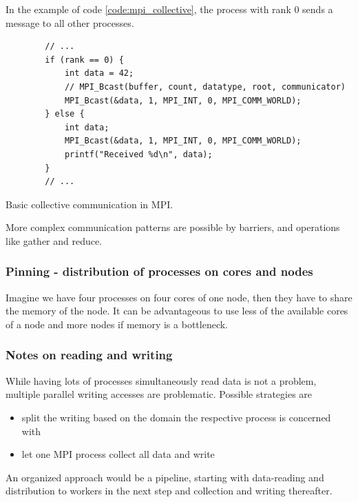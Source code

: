 In the example of code \ref{code:mpi_collective}, the process with rank $0$ sends
a message to all other processes.

\begin{codebox}[!htb]
    \begin{verbatim}
        // ...
        if (rank == 0) {
            int data = 42;
            // MPI_Bcast(buffer, count, datatype, root, communicator)
            MPI_Bcast(&data, 1, MPI_INT, 0, MPI_COMM_WORLD);
        } else {
            int data;
            MPI_Bcast(&data, 1, MPI_INT, 0, MPI_COMM_WORLD);
            printf("Received %d\n", data);
        }
        // ...
    \end{verbatim}
    \caption{Basic collective communication in MPI.}
    \label{code:mpi_collective}
\end{codebox}

More complex communication patterns are possible by barriers, and operations
like gather and reduce.

\subsubsection{Pinning - distribution of processes on cores and nodes}
Imagine we have four processes on four cores of one node, then they have to share
the memory of the node. It can be advantageous to use less of the available cores
of a node and more nodes if memory is a bottleneck.

\subsubsection{Notes on reading and writing}
While having lots of processes simultaneously read data is not a problem, \textcolor{red1}{multiple parallel writing
accesses} are problematic. Possible strategies are
\begin{itemize}
    \item split the writing based on the domain the respective process is concerned with
    \item let one MPI process collect all data and write
\end{itemize}
An organized approach would be a pipeline, starting with data-reading and
distribution to workers in the next step and collection and writing thereafter.

